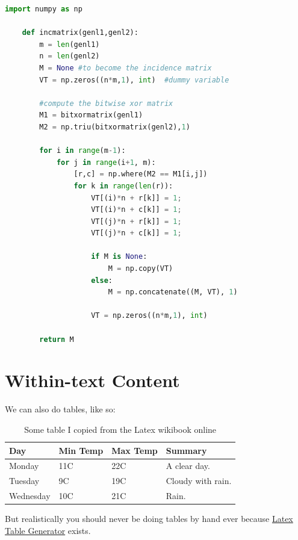 \documentclass[12pt]{article}
\begin{document}
    \begin{lstlisting}[language=Python]
    import numpy as np
     
    def incmatrix(genl1,genl2):
        m = len(genl1)
        n = len(genl2)
        M = None #to become the incidence matrix
        VT = np.zeros((n*m,1), int)  #dummy variable
     
        #compute the bitwise xor matrix
        M1 = bitxormatrix(genl1)
        M2 = np.triu(bitxormatrix(genl2),1) 
     
        for i in range(m-1):
            for j in range(i+1, m):
                [r,c] = np.where(M2 == M1[i,j])
                for k in range(len(r)):
                    VT[(i)*n + r[k]] = 1;
                    VT[(i)*n + c[k]] = 1;
                    VT[(j)*n + r[k]] = 1;
                    VT[(j)*n + c[k]] = 1;
     
                    if M is None:
                        M = np.copy(VT)
                    else:
                        M = np.concatenate((M, VT), 1)
     
                    VT = np.zeros((n*m,1), int)
     
        return M
    \end{lstlisting}


	
	\newpage
	\section{Within-text Content}

	We can also do tables, like so:

	\begin{center}
		\begin{table}[!ht]
		    \begin{tabular}{ | l | l | l | p{5cm} |}
		    \hline
		    Day & Min Temp & Max Temp & Summary \\ \hline
		    Monday & 11C & 22C & A clear day. \\ 	\hline
		    Tuesday & 9C & 19C & Cloudy with rain.\\ \hline
		    Wednesday & 10C & 21C & Rain. \\
		    \hline
		    \end{tabular}
			\caption{Some table I copied from the Latex wikibook online}
			\label{shittytable}
		\end{table}
	\end{center}
	
	But realistically you should never be doing tables by hand ever because \href{http://www.tablesgenerator.com/latex_tables}{Latex Table Generator} exists.
\end{document}
